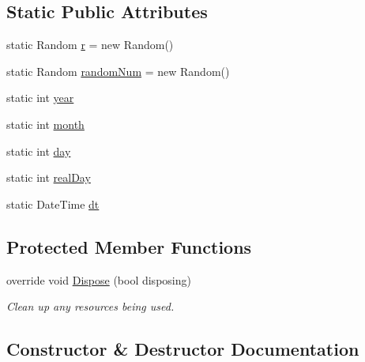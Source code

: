 \subsection*{Static Public Attributes}
\begin{DoxyCompactItemize}
\item 
static Random \mbox{\hyperlink{class_client_1_1_bulk_client_form_aec9d029f1ae8d10bef537f77336da928}{r}} = new Random()
\item 
static Random \mbox{\hyperlink{class_client_1_1_bulk_client_form_a7078b4f3e0e2a7279720ef0cbf90ed3c}{random\+Num}} = new Random()
\item 
static int \mbox{\hyperlink{class_client_1_1_bulk_client_form_af63477f7eef3ff21f72474e568c2a143}{year}}
\item 
static int \mbox{\hyperlink{class_client_1_1_bulk_client_form_a7b8687df520c95b685759aa8f2823b0b}{month}}
\item 
static int \mbox{\hyperlink{class_client_1_1_bulk_client_form_aab0c2504e7939c1175f5605dc0f435d1}{day}}
\item 
static int \mbox{\hyperlink{class_client_1_1_bulk_client_form_ae9e9e5fb25241053492ab55351cea949}{real\+Day}}
\item 
static Date\+Time \mbox{\hyperlink{class_client_1_1_bulk_client_form_a54a644e8a4a92ed07cb0970ae557728a}{dt}}
\end{DoxyCompactItemize}
\subsection*{Protected Member Functions}
\begin{DoxyCompactItemize}
\item 
override void \mbox{\hyperlink{class_client_1_1_bulk_client_form_a36e09756179becfcc35fa8c09fa8c738}{Dispose}} (bool disposing)
\begin{DoxyCompactList}\small\item\em Clean up any resources being used. \end{DoxyCompactList}\end{DoxyCompactItemize}


\subsection{Constructor \& Destructor Documentation}
\mbox{\label{class_client_1_1_bulk_client_form_a04bd4b85e81d89abe705730c898659a5}} 
